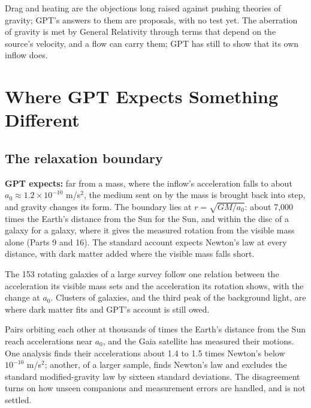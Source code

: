 \documentclass[11pt,a4paper]{article}
\begin{document}
\nocite{herrmann2009,michelson1887,carlip2000,rashadaPart15,rashadaPart27}

 Drag and heating are the objections long raised against pushing theories of gravity; GPT's answers to them are proposals, with no test yet. The aberration of gravity is met by General Relativity through terms that depend on the source's velocity, and a flow can carry them; GPT has still to show that its own inflow does.


\section{Where GPT Expects Something Different}\label{sec:diverge}

\subsection{The relaxation boundary}\label{sec:boundary}

\begin{hypbar}
\textbf{GPT expects:} far from a mass, where the inflow's acceleration falls to about $a_0 \approx 1.2\times10^{-10}$ m/s$^2$, the medium sent on by the mass is brought back into step, and gravity changes its form. The boundary lies at $r = \sqrt{GM/a_0}$: about 7,000 times the Earth's distance from the Sun for the Sun, and within the disc of a galaxy for a galaxy, where it gives the measured rotation from the visible mass alone (Parts 9 and 16).\footnotemark{} The standard account expects Newton's law at every distance, with dark matter added where the visible mass falls short.
\end{hypbar}

 The 153 rotating galaxies of a large survey follow one relation between the acceleration its visible mass sets and the acceleration its rotation shows, with the change at $a_0$. Clusters of galaxies, and the third peak of the background light, are where dark matter fits and GPT's account is still owed.

 Pairs orbiting each other at thousands of times the Earth's distance from the Sun reach accelerations near $a_0$, and the Gaia satellite has measured their motions. One analysis finds their accelerations about 1.4 to 1.5 times Newton's below $10^{-10}$ m/s$^2$; another, of a larger sample, finds Newton's law and excludes the standard modified-gravity law by sixteen standard deviations. The disagreement turns on how unseen companions and measurement errors are handled, and is not settled.
\end{document}
